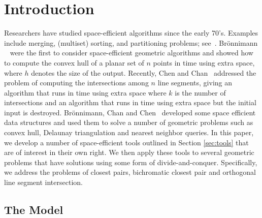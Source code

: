 



\section{Introduction}

Researchers have studied space-efficient algorithms since the early
70's. Examples include merging, (multiset) sorting, and partitioning
problems;
see~\cite{geffert:merging,katajainen:multisets,katajainen:partitioning}.
Br\"onnimann \etal~\cite{bronnimann:convex} were the first to consider
space-efficient geometric algorithms and showed how to compute the
convex hull of a planar set of $n$ points in  time using
 extra space, where $h$ denotes the size of the output.
Recently, Chen and Chan~\cite{chen:space-efficient} addressed the
problem of computing the intersections among $n$ line segments, giving
an algorithm that runs in  time using 
extra space where $k$ is the number of intersections and an algorithm
that runs in  time using  extra space but the
initial input is destroyed.  Br\"onnimann, Chan and
Chen~\cite{bronnimann:inplace} developed some space efficient data
structures and used them to solve a number of geometric problems such
as convex hull, Delaunay triangulation and nearest neighbor queries.
In this paper, we develop a number of space-efficient tools outlined
in Section \ref{sec:tools} that are of interest in their own right. We
then apply these tools to several geometric problems that have
solutions using some form of divide-and-conquer. Specifically, we
address the problems of closest pairs, bichromatic closest pair 
and orthogonal line segment intersection.


\subsection{The Model}

